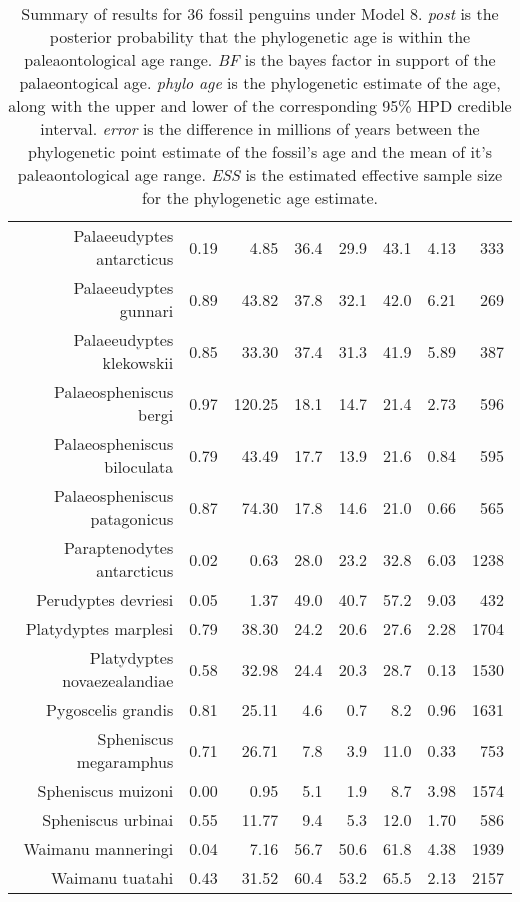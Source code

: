 \begin{table}[ht]
\begin{tabular}{rrrrrrrr}
  Palaeeudyptes antarcticus & 0.19 & 4.85 & 36.4 & 29.9 & 43.1 & 4.13 & 333 \\ 
  Palaeeudyptes gunnari & 0.89 & 43.82 & 37.8 & 32.1 & 42.0 & 6.21 & 269 \\ 
  Palaeeudyptes klekowskii & 0.85 & 33.30 & 37.4 & 31.3 & 41.9 & 5.89 & 387 \\ 
  Palaeospheniscus bergi & 0.97 & 120.25 & 18.1 & 14.7 & 21.4 & 2.73 & 596 \\ 
  Palaeospheniscus biloculata & 0.79 & 43.49 & 17.7 & 13.9 & 21.6 & 0.84 & 595 \\ 
  Palaeospheniscus patagonicus & 0.87 & 74.30 & 17.8 & 14.6 & 21.0 & 0.66 & 565 \\ 
  Paraptenodytes antarcticus & 0.02 & 0.63 & 28.0 & 23.2 & 32.8 & 6.03 & 1238 \\ 
  Perudyptes devriesi & 0.05 & 1.37 & 49.0 & 40.7 & 57.2 & 9.03 & 432 \\ 
  Platydyptes marplesi & 0.79 & 38.30 & 24.2 & 20.6 & 27.6 & 2.28 & 1704 \\ 
  Platydyptes novaezealandiae & 0.58 & 32.98 & 24.4 & 20.3 & 28.7 & 0.13 & 1530 \\ 
  Pygoscelis grandis & 0.81 & 25.11 & 4.6 & 0.7 & 8.2 & 0.96 & 1631 \\ 
  Spheniscus megaramphus & 0.71 & 26.71 & 7.8 & 3.9 & 11.0 & 0.33 & 753 \\ 
  Spheniscus muizoni & 0.00 & 0.95 & 5.1 & 1.9 & 8.7 & 3.98 & 1574 \\ 
  Spheniscus urbinai & 0.55 & 11.77 & 9.4 & 5.3 & 12.0 & 1.70 & 586 \\ 
  Waimanu manneringi & 0.04 & 7.16 & 56.7 & 50.6 & 61.8 & 4.38 & 1939 \\ 
  Waimanu tuatahi & 0.43 & 31.52 & 60.4 & 53.2 & 65.5 & 2.13 & 2157 \\ 
   \hline
\end{tabular}
\caption{Summary of results for 36 fossil penguins under Model 8. {\em post} is the posterior probability that the phylogenetic age is within the paleaontological age range. {\em BF} is the bayes factor in support of the palaeontogical age. {\em phylo age} is the phylogenetic estimate of the age, along with the upper and lower of the corresponding 95\% HPD credible interval. {\em error} is the difference in millions of years between the phylogenetic point estimate of the fossil's age and the mean of it's paleaontological age range. {\em ESS} is the estimated effective sample size for the phylogenetic age estimate.} 
\label{fossilTable8}
\end{table}
